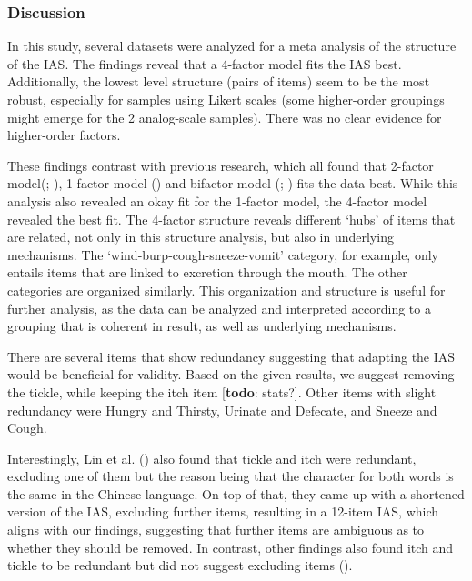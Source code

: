 \documentclass[
  man,
  floatsintext,
  longtable,
  nolmodern,
  notxfonts,
  notimes,
  colorlinks=true,linkcolor=blue,citecolor=blue,urlcolor=blue]{apa7}
\begin{document}
\subsubsection{Discussion}\label{discussion}

In this study, several datasets were analyzed for a meta analysis of the
structure of the IAS. The findings reveal that a 4-factor model fits the
IAS best. Additionally, the lowest level structure (pairs of items) seem
to be the most robust, especially for samples using Likert scales (some
higher-order groupings might emerge for the 2 analog-scale samples).
There was no clear evidence for higher-order factors.

These findings contrast with previous research, which all found that
2-factor model(;
), 1-factor model
() and bifactor model
(;
) fits the data best. While this
analysis also revealed an okay fit for the 1-factor model, the 4-factor
model revealed the best fit. The 4-factor structure reveals different
`hubs' of items that are related, not only in this structure analysis,
but also in underlying mechanisms. The `wind-burp-cough-sneeze-vomit'
category, for example, only entails items that are linked to excretion
through the mouth. The other categories are organized similarly. This
organization and structure is useful for further analysis, as the data
can be analyzed and interpreted according to a grouping that is coherent
in result, as well as underlying mechanisms.

There are several items that show redundancy suggesting that adapting
the IAS would be beneficial for validity. Based on the given results, we
suggest removing the tickle, while keeping the itch item
{[}\textbf{todo}: stats?{]}. Other items with slight redundancy were
Hungry and Thirsty, Urinate and Defecate, and Sneeze and Cough.

Interestingly, Lin et al. () also found that
tickle and itch were redundant, excluding one of them but the reason
being that the character for both words is the same in the Chinese
language. On top of that, they came up with a shortened version of the
IAS, excluding further items, resulting in a 12-item IAS, which aligns
with our findings, suggesting that further items are ambiguous as to
whether they should be removed. In contrast, other findings also found
itch and tickle to be redundant but did not suggest excluding items
().
\end{document}
